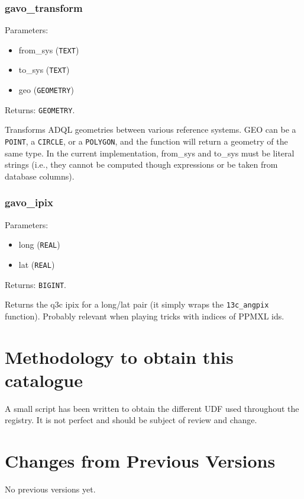 \documentclass[11pt,a4paper]{ivoa}
\begin{document}
\subsubsection{gavo\_transform}

Parameters:

\begin{itemize}
	\item from\_sys (\texttt{TEXT})
	\item to\_sys (\texttt{TEXT})
	\item geo (\texttt{GEOMETRY})
\end{itemize}

Returns: \texttt{GEOMETRY}.

Transforms ADQL geometries between various reference systems. GEO can be
a \texttt{POINT}, a \texttt{CIRCLE}, or a \texttt{POLYGON}, and the
function will return a geometry of the same type. In the current
implementation, from\_sys and to\_sys must be literal strings (i.e.,
they cannot be computed though expressions or be taken from database
columns).

\subsubsection{gavo\_ipix}

Parameters:

\begin{itemize}
	\item long (\texttt{REAL})
	\item lat (\texttt{REAL})
\end{itemize}

Returns: \texttt{BIGINT}.

Returns the q3c ipix for a long/lat pair (it simply wraps the
\texttt{13c\_angpix} function). Probably relevant when playing tricks
with indices of PPMXL ids.

\appendix

\section{Methodology to obtain this catalogue}

A small script has been written to obtain the different UDF used
throughout the registry. It is not perfect and should be subject of
review and change.

\section{Changes from Previous Versions}

No previous versions yet.  



\end{document}
